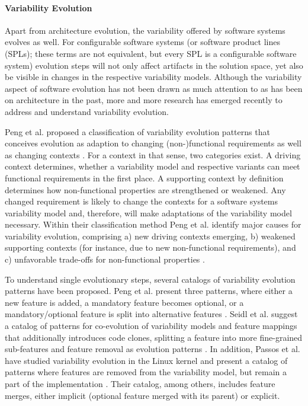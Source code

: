 \documentclass[bibliography=totoc]{tubsreprt}
\begin{document}
\paragraph*{Variability Evolution}
Apart from architecture evolution, the variability offered by software systems
evolves as well. For configurable software systems (or software product lines
(SPLs); these terms are not equivalent, but every SPL is a configurable
software system) evolution steps will not only affect artifacts in the solution
space, yet also be visible in changes in the respective variability models.
Although the variability aspect of software evolution has not been drawn as
much attention to as has been on architecture in the past, more and more
research has emerged recently to address and understand variability evolution.

Peng et al. proposed a classification of variability evolution patterns that
conceives evolution as adaption to changing (non-)functional requirements as
well as changing contexts \cite{peng_analyzing_2011}. For a context in that sense, two
categories exist.
A driving context determines, whether a variability model and respective variants
can meet functional requirements in the first place. A supporting context by
definition determines how non-functional properties are strengthened or
weakened. Any changed requirement is likely to change the contexts for a
software systems variability model and, therefore, will make adaptations of the
variability model necessary. Within their classification method Peng et al.
identify  major causes for variability evolution, comprising a) new driving
contexts emerging, b) weakened supporting contexts (for instance, due to new
non-functional requirements), and c) unfavorable trade-offs for non-functional
properties \cite{peng_analyzing_2011}. 

To understand single evolutionary steps, several catalogs of variability
evolution patterns have been proposed. Peng et al. present three patterns,
where either a new feature is added, a mandatory feature becomes optional, or a
mandatory/optional feature is split into alternative features
\cite{peng_analyzing_2011}. Seidl et al. suggest a catalog of patterns for
co-evolution of variability models and feature mappings that additionally introduces code clones, splitting a feature
into more fine-grained sub-features and feature removal as evolution patterns
\cite{seidl_co-evolution_2012}.
In addition, Passos et al. have studied variability evolution in the Linux
kernel and present a catalog of patterns where features are removed from the
variability model, but remain a part of the implementation \cite{passos_towards_2012}. Their
catalog, among others, includes feature merges, either implicit (optional feature merged
with its parent) or explicit.
\end{document}
